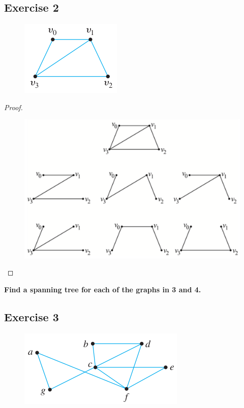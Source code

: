 \documentclass[14pt]{extarticle}
\newcommand{\cy}{\color{cyan}}
\begin{document}
\subsection{Exercise 2}
\begin{figure}[ht!]
    \centering
    \includegraphics[scale=0.5]{../images/10.6.2.png}
\end{figure}

\begin{proof}
    \begin{figure}[ht!]
        \centering
        \includegraphics[scale=0.2]{../images/10.6.2.2.png}
    \end{figure}
\end{proof}

{\bf \cy Find a spanning tree for each of the graphs in 3 and 4.}

\subsection{Exercise 3}
\begin{figure}[ht!]
    \centering
    \includegraphics[scale=0.5]{../images/10.6.3.png}
\end{figure}
\end{document}
